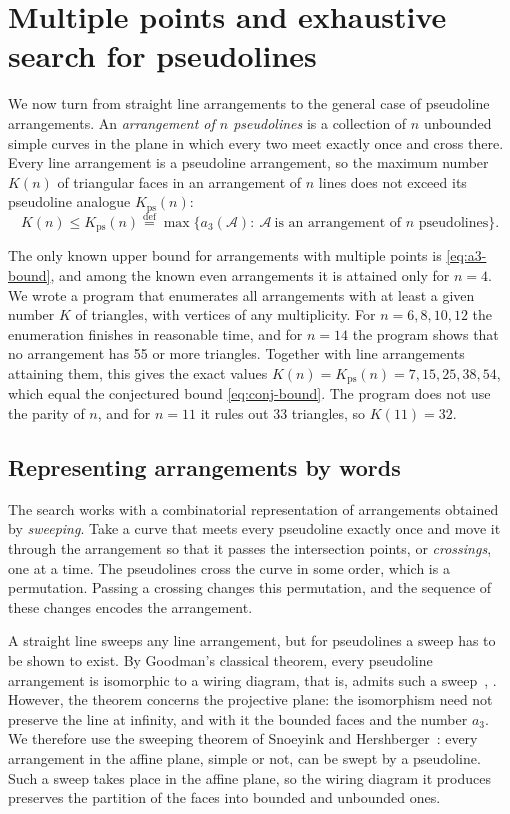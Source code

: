 \section{Multiple points and exhaustive search for pseudolines}\label{sec:enum}

We now turn from straight line arrangements to the general case of pseudoline arrangements.
An \emph{arrangement of $n$ pseudolines} is a collection of $n$ unbounded simple curves in the plane in which every two meet exactly once and cross there.
Every line arrangement is a pseudoline arrangement, so the maximum number $K(n)$ of triangular faces in an arrangement of $n$ lines does not exceed its pseudoline analogue $K_{\mathrm{ps}}(n)$:
\begin{equation}\label{eq:K-ps}
K(n)\le K_{\mathrm{ps}}(n)\overset{\mathrm{def}}{=}\max\{a_3(\mathcal A):\ \mathcal A\ \text{is an arrangement of } n \text{ pseudolines}\}.
\end{equation}

The only known upper bound for arrangements with multiple points is \eqref{eq:a3-bound}, and among the known even arrangements it is attained only for $n=4$.
We wrote a program that enumerates all arrangements with at least a given number $K$ of triangles, with vertices of any multiplicity.
For $n=6,8,10,12$ the enumeration finishes in reasonable time, and for $n=14$ the program shows that no arrangement has 55 or more triangles.
Together with line arrangements attaining them, this gives the exact values $K(n)=K_{\mathrm{ps}}(n)=7,15,25,38,54$, which equal the conjectured bound \eqref{eq:conj-bound}.
The program does not use the parity of $n$, and for $n=11$ it rules out 33 triangles, so $K(11)=32$.

\subsection{Representing arrangements by words}

The search works with a combinatorial representation of arrangements obtained by \emph{sweeping}.
Take a curve that meets every pseudoline exactly once and move it through the arrangement so that it passes the intersection points, or \emph{crossings}, one at a time.
The pseudolines cross the curve in some order, which is a permutation.
Passing a crossing changes this permutation, and the sequence of these changes encodes the arrangement.

A straight line sweeps any line arrangement, but for pseudolines a sweep has to be shown to exist.
By Goodman's classical theorem, every pseudoline arrangement is isomorphic to a wiring diagram, that is, admits such a sweep~\cite{goodman80}, \cite[Theorem~5.1.4]{fg17}.
However, the theorem concerns the projective plane: the isomorphism need not preserve the line at infinity, and with it the bounded faces and the number $a_3$.
We therefore use the sweeping theorem of Snoeyink and Hershberger~\cite[Theorem~3.1]{sh89}: every arrangement in the affine plane, simple or not, can be swept by a pseudoline.
Such a sweep takes place in the affine plane, so the wiring diagram it produces preserves the partition of the faces into bounded and unbounded ones.

